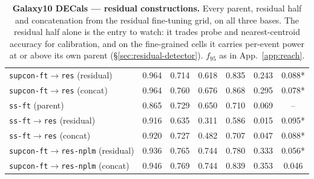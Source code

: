 \documentclass{article}
\begin{document}
\begin{table}[p]
\begin{tabular}{lcccccc}
\texttt{supcon-ft$\to$res} (residual) & 0.964 & 0.714 & 0.618 & 0.835 & 0.243 & 0.088* \\
\texttt{supcon-ft$\to$res} (concat) & 0.964 & 0.760 & 0.676 & 0.868 & 0.295 & 0.078* \\
\texttt{ss-ft} (parent) & 0.865 & 0.729 & 0.650 & 0.710 & 0.069 & -- \\
\texttt{ss-ft$\to$res} (residual) & 0.916 & 0.635 & 0.311 & 0.586 & 0.015 & 0.095* \\
\texttt{ss-ft$\to$res} (concat) & 0.920 & 0.727 & 0.482 & 0.707 & 0.047 & 0.088* \\
\texttt{supcon-ft$\to$res-nplm} (residual) & 0.936 & 0.765 & 0.744 & 0.780 & 0.333 & 0.056* \\
\texttt{supcon-ft$\to$res-nplm} (concat) & 0.946 & 0.769 & 0.744 & 0.839 & 0.353 & 0.046 \\
\bottomrule
\end{tabular}
\caption{\textbf{Galaxy10 DECals --- residual constructions.} Every parent, residual half
and concatenation from the residual fine-tuning grid, on all three bases.
The residual half alone is the entry to watch: it trades probe and
nearest-centroid accuracy for calibration, and on the fine-grained cells it
carries per-event power at or above its own parent
(\S\ref{sec:residual-detector}). $f_{95}$ as in App.~\ref{app:reach}.}
\label{tab:res-galaxy10}
\end{table}
\end{document}
